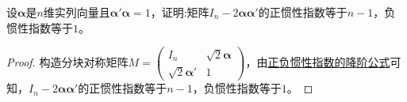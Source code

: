 \documentclass[../../main.tex]{subfiles}%
\begin{document}
\begin{proposition}
设\(\boldsymbol{\alpha}\)是\(n\)维实列向量且\(\boldsymbol{\alpha}'\boldsymbol{\alpha}=1\)，证明:矩阵\(I_n - 2\boldsymbol{\alpha}\boldsymbol{\alpha}'\)的正惯性指数等于\(n - 1\)，负惯性指数等于\(1\)。
\end{proposition}
\begin{proof}

构造分块对称矩阵\(M = \begin{pmatrix}
I_n & \sqrt{2}\boldsymbol{\alpha} \\
\sqrt{2}\boldsymbol{\alpha}' & 1
\end{pmatrix}\)，由\hyperref[proposition:正负惯性指数的降阶公式]{正负惯性指数的降阶公式}可知，\(I_n - 2\boldsymbol{\alpha}\boldsymbol{\alpha}'\)的正惯性指数等于\(n - 1\)，负惯性指数等于\(1\)。

\end{proof}
\end{document}
